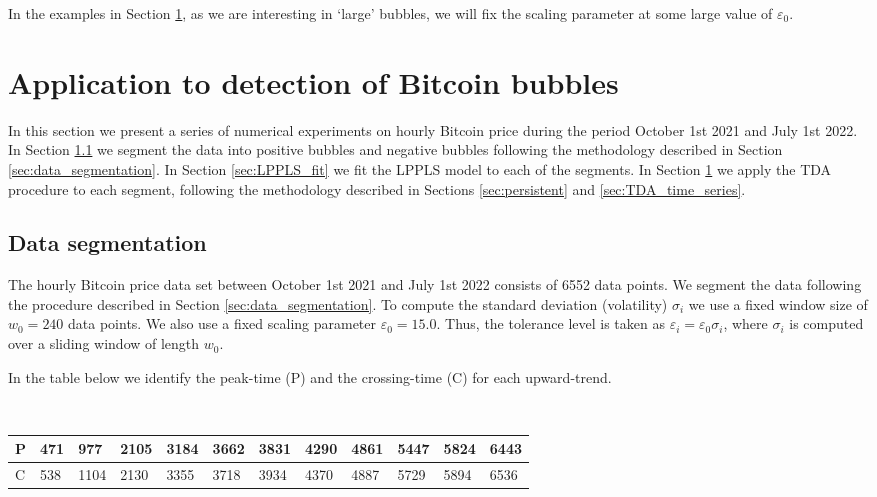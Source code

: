 \documentclass[11pt]{amsart}
\theoremstyle{definition}
\theoremstyle{remark}
\numberwithin{equation}{section}
\newcommand{\eps}{\varepsilon}
\begin{document}
In the examples in Section \ref{sec:TDA_Bitcoin}, as we are interesting in `large' bubbles, we will fix the scaling parameter at some large value of $\eps_0$.

\section{Application to detection of Bitcoin bubbles}\label{sec:TDA_Bitcoin}
In this section we present a series of numerical experiments on hourly Bitcoin price during the period October 1st 2021 and July 1st  2022.
In Section \ref{sec:TDA_segmentation} we segment the data into positive bubbles and negative bubbles following the methodology described in Section \ref{sec:data_segmentation}.
In Section \ref{sec:LPPLS_fit} we fit the LPPLS model to each of the segments.
In Section \ref{sec:TDA_Bitcoin} we apply the TDA procedure to each segment, following the methodology described in  Sections \ref{sec:persistent} and \ref{sec:TDA_time_series}.

\subsection{Data segmentation}
\label{sec:TDA_segmentation}

The hourly Bitcoin price data set between October 1st 2021 and July 1st  2022 consists of 6552 data points.
We segment the data following the procedure described in Section \ref{sec:data_segmentation}.
To compute the standard deviation (volatility) $\sigma_i$ we use a fixed window size of $w_0=240$ data points.
We also use a  fixed scaling parameter $\eps_0=15.0$.
Thus, the tolerance level is taken as $\eps_i=\eps_0\sigma_i$, where $\sigma_i$ is computed over a sliding window of length $w_0$.

In the table below we identify the peak-time (P) and the crossing-time (C) for each upward-trend.


\smallskip


\\
\begin{tabular}{|l|l|l|l|l|l|l|l|l|l|l|l|}
  \hline
P&471 & 977& 2105& 3184& 3662& 3831& 4290& 4861& 5447& 5824& 6443\\
  \hline
C &538& 1104& 2130& 3355 &3718 &3934& 4370 &4887 &5729& 5894 &6536\\
  \hline
\end{tabular}
\end{document}
